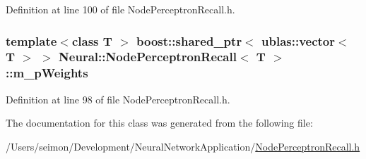 Definition at line 100 of file NodePerceptronRecall.h.

\hypertarget{class_neural_1_1_node_perceptron_recall_afae4b24a101bd200700831b537e3b9c9}{
\subsubsection[{m\_\-pWeights}]{\setlength{\rightskip}{0pt plus 5cm}template$<$class T $>$ boost::shared\_\-ptr$<$ ublas::vector$<$ T $>$ $>$ {\bf Neural::NodePerceptronRecall}$<$ T $>$::{\bf m\_\-pWeights}}}
\label{class_neural_1_1_node_perceptron_recall_afae4b24a101bd200700831b537e3b9c9}


Definition at line 98 of file NodePerceptronRecall.h.



The documentation for this class was generated from the following file:\begin{DoxyCompactItemize}
\item 
/Users/seimon/Development/NeuralNetworkApplication/\hyperlink{_node_perceptron_recall_8h}{NodePerceptronRecall.h}\end{DoxyCompactItemize}
